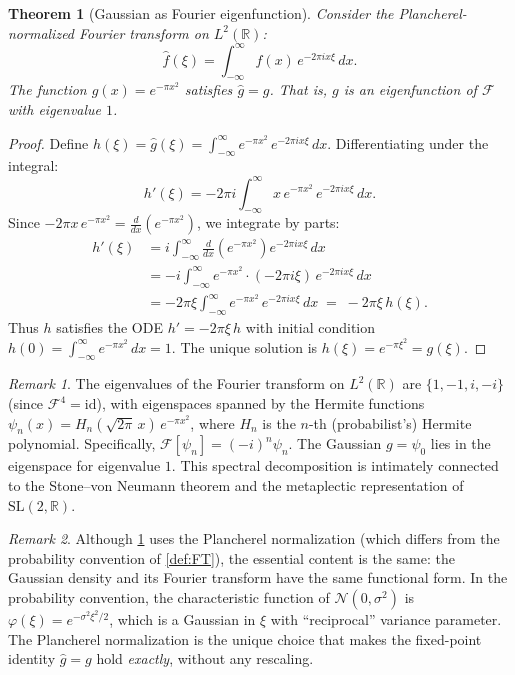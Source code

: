 \documentclass[12pt]{amsart}
\newtheorem{theorem}{Theorem}[section]
\theoremstyle{definition}
\theoremstyle{remark}
\newtheorem*{remark}{Remark}
\newcommand{\R}{\mathbb{R}}
\newcommand{\cN}{\mathcal{N}}
\newcommand{\cF}{\mathcal{F}}
\begin{document}
\begin{theorem}[Gaussian as Fourier eigenfunction]\label{thm:gaussian-fixed}
Consider the Plancherel-normalized Fourier transform on $L^2(\R)$:
\[
\hat{f}(\xi) = \int_{-\infty}^{\infty} f(x)\, e^{-2\pi i x\xi}\, dx.
\]
The function $g(x) = e^{-\pi x^2}$ satisfies $\hat{g} = g$. That is, $g$ is an eigenfunction of $\cF$ with eigenvalue $1$.
\end{theorem}

\begin{proof}
Define $h(\xi) = \hat{g}(\xi) = \int_{-\infty}^{\infty} e^{-\pi x^2}\, e^{-2\pi i x\xi}\, dx$. Differentiating under the integral:
\[
h'(\xi) = -2\pi i \int_{-\infty}^{\infty} x\, e^{-\pi x^2}\, e^{-2\pi i x\xi}\, dx.
\]
Since $-2\pi x\, e^{-\pi x^2} = \frac{d}{dx}\!\left(e^{-\pi x^2}\right)$, we integrate by parts:
\begin{align*}
h'(\xi) &= i \int_{-\infty}^{\infty} \frac{d}{dx}\!\left(e^{-\pi x^2}\right) e^{-2\pi i x\xi}\, dx \\
&= -i \int_{-\infty}^{\infty} e^{-\pi x^2} \cdot (-2\pi i\xi)\, e^{-2\pi i x\xi}\, dx \\
&= -2\pi\xi \int_{-\infty}^{\infty} e^{-\pi x^2}\, e^{-2\pi i x\xi}\, dx \;=\; -2\pi\xi\, h(\xi).
\end{align*}
Thus $h$ satisfies the ODE $h' = -2\pi\xi\, h$ with initial condition $h(0) = \int_{-\infty}^{\infty} e^{-\pi x^2}\, dx = 1$. The unique solution is $h(\xi) = e^{-\pi\xi^2} = g(\xi)$.
\end{proof}

\begin{remark}\label{rmk:eigenvalues}
The eigenvalues of the Fourier transform on $L^2(\R)$ are $\{1, -1, i, -i\}$ (since $\cF^4 = \mathrm{id}$), with eigenspaces spanned by the Hermite functions $\psi_n(x) = H_n(\sqrt{2\pi}\, x)\, e^{-\pi x^2}$, where $H_n$ is the $n$-th (probabilist's) Hermite polynomial. Specifically, $\cF[\psi_n] = (-i)^n \psi_n$. The Gaussian $g = \psi_0$ lies in the eigenspace for eigenvalue $1$. This spectral decomposition is intimately connected to the Stone--von Neumann theorem and the metaplectic representation of $\mathrm{SL}(2, \R)$.
\end{remark}

\begin{remark}\label{rmk:convention-bridge}
Although \cref{thm:gaussian-fixed} uses the Plancherel normalization (which differs from the probability convention of \cref{def:FT}), the essential content is the same: the Gaussian density and its Fourier transform have the same functional form. In the probability convention, the characteristic function of $\cN(0, \sigma^2)$ is $\varphi(\xi) = e^{-\sigma^2\xi^2/2}$, which is a Gaussian in $\xi$ with ``reciprocal'' variance parameter. The Plancherel normalization is the unique choice that makes the fixed-point identity $\hat{g} = g$ hold \emph{exactly}, without any rescaling.
\end{remark}
\end{document}
